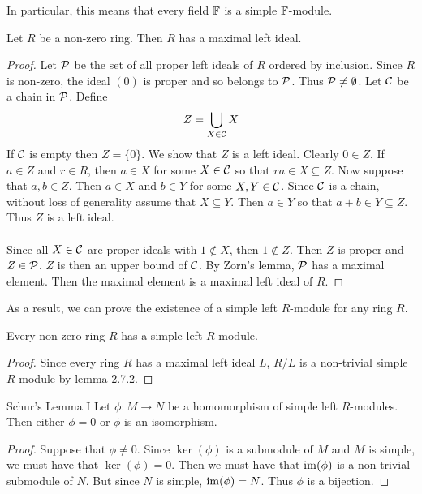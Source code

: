 \documentclass[a4paper]{article}
\begin{document}
In particular, this means that every field $\mathbb{F}$ is a simple $\mathbb{F}$-module. 

\begin{thm}{}{} Let $R$ be a non-zero ring. Then $R$ has a maximal left ideal. \tcbline
\begin{proof}
Let $\mathcal{P}$ be the set of all proper left ideals of $R$ ordered by inclusion. Since $R$ is non-zero, the ideal $(0)$ is proper and so belongs to $\mathcal{P}$. Thus $\mathcal{P}\neq\emptyset$. Let $\mathcal{C}$ be a chain in $\mathcal{P}$. Define $$Z=\bigcup_{X\in\mathcal{C}}X$$ If $\mathcal{C}$ is empty then $Z=\{0\}$. We show that $Z$ is a left ideal. Clearly $0\in Z$. If $a\in Z$ and $r\in R$, then $a\in X$ for some $X\in\mathcal{C}$ so that $ra\in X\subseteq Z$. Now suppose that $a,b\in Z$. Then $a\in X$ and $b\in Y$ for some $X,Y\in\mathcal{C}$. Since $\mathcal{C}$ is a chain, without loss of generality assume that $X\subseteq Y$. Then $a\in Y$ so that $a+b\in Y\subseteq Z$. Thus $Z$ is a left ideal. \\~\\

Since all $X\in\mathcal{C}$ are proper ideals with $1\notin X$, then $1\notin Z$. Then $Z$ is proper and $Z\in\mathcal{P}$. $Z$ is then an upper bound of $\mathcal{C}$. By Zorn's lemma, $\mathcal{P}$ has a maximal element. Then the maximal element is a maximal left ideal of $R$. 
\end{proof}
\end{thm}

As a result, we can prove the existence of a simple left $R$-module for any ring $R$. 

\begin{crl}{}{} Every non-zero ring $R$ has a simple left $R$-module. \tcbline
\begin{proof}
Since every ring $R$ has a maximal left ideal $L$, $R/L$ is a non-trivial simple $R$-module by lemma 2.7.2. 
\end{proof}
\end{crl}

\begin{prp}{Schur's Lemma I}{} Let $\phi:M\to N$ be a homomorphism of simple left $R$-modules. Then either $\phi=0$ or $\phi$ is an isomorphism. \tcbline
\begin{proof}
Suppose that $\phi\neq 0$. Since $\ker(\phi)$ is a submodule of $M$ and $M$ is simple, we must have that $\ker(\phi)=0$. Then we must have that $\operatorname{im}(\phi)$ is a non-trivial submodule of $N$. But since $N$ is simple, $\operatorname{im}(\phi)=N$. Thus $\phi$ is a bijection. 
\end{proof}
\end{prp}
\end{document}
